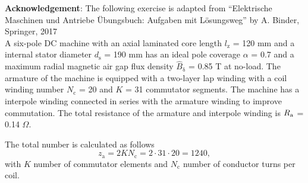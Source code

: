 
\normalsize{\textbf{Acknowledgement}: The following exercise is adapted from ``Elektrische Maschinen und Antriebe Übungsbuch: Aufgaben mit Lösungsweg'' by A. Binder, Springer, 2017}\\


A six-pole DC machine with an axial laminated core length $l_{\mathrm{z}}$ = 120 mm and a internal stator diameter $d_{\mathrm{s}}$ = 190 mm has an ideal pole coverage $\alpha$ = 0.7 and a maximum radial magnetic air gap flux density $\hat{B}_{\updelta}$ = 0.85 T at no-load. The armature of the machine is equipped with a two-layer lap winding with a coil winding number $N_{\mathrm{c}}$ = 20 and $K$ = 31 commutator segments.
The machine has a interpole winding connected in series with the armature winding to improve commutation. The total resistance of the armature and interpole winding is $R_{\mathrm{a}}$ = 0.14 $\Omega$.


\begin{solutionblock}
	The total number is calculated as follows
	\begin{equation}
		z_{\mathrm{a}} = 2 K N_{\mathrm{c}}
		= 2 \cdot 31 \cdot 20
		= 1240,
	\end{equation}
	with $K$ number of commutator elements and $N_{\mathrm{c}}$ number of conductor turns per coil.

\end{solutionblock}


